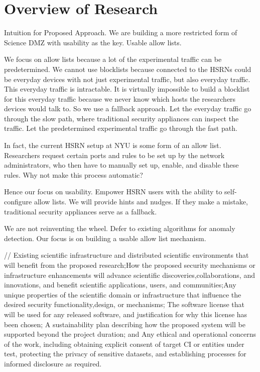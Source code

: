\section{Overview of Research}

Intuition for Proposed Approach. We are building a more restricted form of Science DMZ with usability as the key. Usable allow lists.

We focus on allow lists because a lot of the experimental traffic can be predetermined. We cannot use blocklists because connected to the HSRNs could be everyday devices with not just experimental traffic, but also everyday traffic. This everyday traffic is intractable. It is virtually impossible to build a blocklist for this everyday traffic because we never know which hosts the researchers devices would talk to. So we use a fallback approach. Let the everyday traffic go through the slow path, where traditional security appliances can inspect the traffic. Let the predetermined experimental traffic go through the fast path.

In fact, the current HSRN setup at NYU is some form of an allow list. Researchers request certain ports and rules to be set up by the network administrators, who then have to manually set up, enable, and disable these rules. Why not make this process automatic?

Hence our focus on usability. Empower HSRN users with the ability to self-configure allow lists. We will provide hints and nudges. If they make a mistake, traditional security appliances serve as a fallback.

We are not reinventing the wheel. Defer to existing algorithms for anomaly detection. Our focus is on building a usable allow list mechanism.

// Existing scientific infrastructure and distributed scientific environments that will benefit from the proposed research;How the proposed security mechanisms or infrastructure enhancements will advance scientific discoveries,collaborations, and innovations, and benefit scientific applications, users, and communities;Any unique properties of the scientific domain or infrastructure that influence the desired security functionality,design, or mechanisms; The software license that will be used for any released software, and justification for why this license has been chosen; A sustainability plan describing how the proposed system will be supported beyond the project duration; and Any ethical and operational concerns of the work, including obtaining explicit consent of target CI or entities under test, protecting the privacy of sensitive datasets, and establishing processes for informed disclosure as required.

